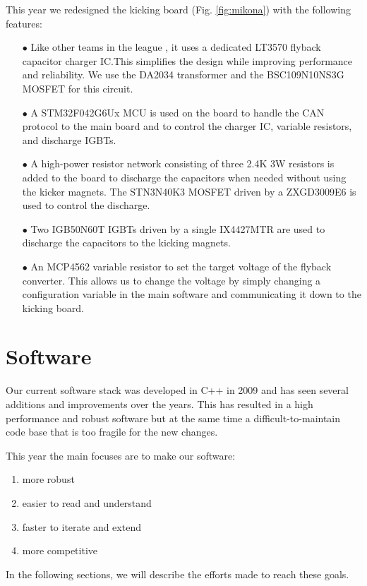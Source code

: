 \documentclass[runningheads]{llncs}
\begin{document}
This year we redesigned the kicking board (Fig. \ref{fig:mikona}) with the following features:
\begin{enumerate}
    \item[$\bullet$] Like other teams in the league \cite{ref_tigers_etdp_2020}, it uses a dedicated LT3570 flyback capacitor charger IC.This simplifies the design while improving performance and reliability. We use the DA2034 transformer and the BSC109N10NS3G MOSFET for this circuit.
    \item[$\bullet$] A STM32F042G6Ux MCU is used on the board to handle the CAN protocol to the main board and to control the charger IC, variable resistors, and discharge IGBTs.
    \item[$\bullet$] A high-power resistor network consisting of three 2.4K 3W resistors is added to the board to discharge the capacitors when needed without using the kicker magnets. The STN3N40K3 MOSFET driven by a ZXGD3009E6 is used to control the discharge.
    \item[$\bullet$] Two IGB50N60T IGBTs driven by a single IX4427MTR are used to discharge the capacitors to the kicking magnets.
    \item[$\bullet$] An MCP4562 variable resistor to set the target voltage of the flyback converter. This allows us to change the voltage by simply changing a configuration variable in the main software and communicating it down to the kicking board.
\end{enumerate}

\section{Software}
Our current software stack was developed in C++ in 2009 and has seen several additions and improvements over the years. This has resulted in a high performance and robust software but at the same time a difficult-to-maintain code base that is too fragile for the new changes.

This year the main focuses are to make our software:

\begin{enumerate}
    \item more robust
    \item easier to read and understand
    \item faster to iterate and extend
    \item more competitive
\end{enumerate}
In the following sections, we will describe the efforts made to reach these goals.
\end{document}
